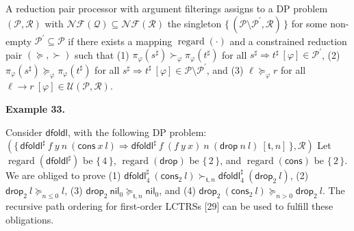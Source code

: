 \documentclass[10pt,a4paper]{amsart}
\begin{document}
A reduction pair processor with argument filterings assigns to a DP problem $(\mathcal{P},\mathcal{R})$ with $\mathcal{N}\!\mathcal{F}(\mathcal{Q})\subseteq\mathcal{N}\!\mathcal{F}(\mathcal{R})$ the singleton $\{\,(\mathcal{P}\setminus\mathcal{P}^{\prime},\mathcal{R})\,\}$ for some non-empty $\mathcal{P}^{\prime}\subseteq\mathcal{P}$ if there exists a mapping $\operatorname{regard}(\cdot)$ and a constrained reduction pair $(\succeq,\succ)$ such that (1) ${\pi_{\varphi}(s^{\sharp})}\mathrel{\succ}_{\varphi}{\pi_{\varphi}(t^{\sharp})}$ for all ${s^{\sharp}}\Rightarrow{t^{\sharp}}\ [\varphi]\in\mathcal{P}^{\prime}$, (2) ${\pi_{\varphi}(s^{\sharp})}\mathrel{\succeq}_{\varphi}{\pi_{\varphi}(t^{\sharp})}$ for all ${s^{\sharp}}\Rightarrow{t^{\sharp}}\ [\varphi]\in\mathcal{P}\setminus\mathcal{P}^{\prime}$, and (3) ${\ell}\mathrel{\succeq}_{\varphi}{r}$ for all ${\ell}\rightarrow{r}\ [\varphi]\in\mathcal{U}(\mathcal{P},\mathcal{R})$.\par
 
 
 
 
\par\medskip\noindent\textbf{Example 33.}\par
 
 
Consider $\mathsf{dfoldl}$, with the following DP problem: $(\{\,{{{{{\mathsf{dfoldl}^{\sharp}}\ {f}}\ {y}}\ {n}}\ {({{\mathsf{cons}}\ {x}}\ {l})}}\Rightarrow{{{{{\mathsf{dfoldl}^{\sharp}}\ {f}}\ {({{f}\ {y}}\ {x})}}\ {n}}\ {({{\mathsf{drop}}\ {n}}\ {l})}}\ [\mathfrak{t},n]\,\},\mathcal{R})$ Let $\operatorname{regard}(\mathsf{dfoldl}^{\sharp})$ be $\{\,4\,\}$, $\operatorname{regard}(\mathsf{drop})$ be $\{\,2\,\}$, and $\operatorname{regard}(\mathsf{cons})$ be $\{\,2\,\}$. We are obliged to prove (1) ${{\mathsf{dfoldl}^{\sharp}_{4}}\ {({\mathsf{cons}_{2}}\ {l})}}\mathrel{\succ}_{\mathfrak{t},n}{{\mathsf{dfoldl}^{\sharp}_{4}}\ {({\mathsf{drop}_{2}}\ {l})}}$, (2) ${{\mathsf{drop}_{2}}\ {l}}\mathrel{\succeq}_{n\leq 0}{l}$, (3) ${{\mathsf{drop}_{2}}\ {\mathsf{nil}_{0}}}\mathrel{\succeq}_{\mathfrak{t},n}{\mathsf{nil}_{0}}$, and (4) ${{\mathsf{drop}_{2}}\ {({\mathsf{cons}_{2}}\ {l})}}\mathrel{\succeq}_{n>0}{{\mathsf{drop}_{2}}\ {l}}$. The recursive path ordering for first-order LCTRSs [29] can be used to fulfill these obligations.\par
 
 
\end{document}
